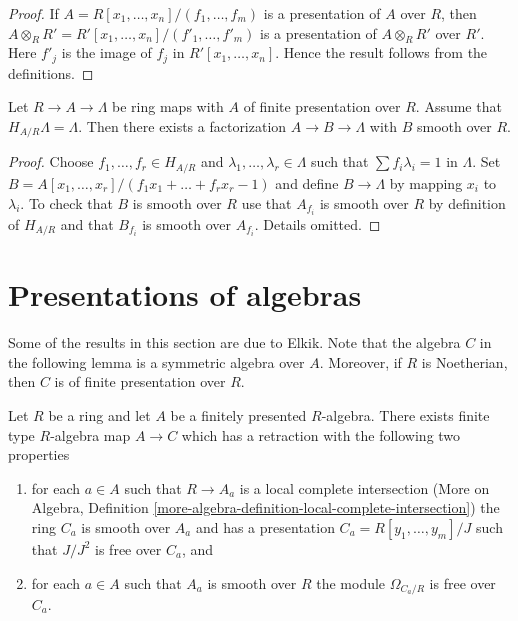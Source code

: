 \begin{proof}
If $A = R[x_1, \ldots, x_n]/(f_1, \ldots, f_m)$ is a presentation
of $A$ over $R$, then
$A \otimes_R R' = R'[x_1, \ldots, x_n]/(f'_1, \ldots, f'_m)$
is a presentation of $A \otimes_R R'$ over $R'$. Here $f'_j$ is
the image of $f_j$ in $R'[x_1, \ldots, x_n]$.
Hence the result follows from the definitions.
\end{proof}

\begin{lemma}
\label{lemma-final-solve}
Let $R \to A \to \Lambda$ be ring maps with $A$ of finite presentation
over $R$. Assume that $H_{A/R} \Lambda = \Lambda$. Then there exists
a factorization $A \to B \to \Lambda$ with $B$ smooth over $R$.
\end{lemma}

\begin{proof}
Choose $f_1, \ldots, f_r \in H_{A/R}$ and
$\lambda_1, \ldots, \lambda_r \in \Lambda$ such that
$\sum f_i\lambda_i = 1$ in $\Lambda$. Set
$B = A[x_1, \ldots, x_r]/(f_1x_1 + \ldots + f_rx_r - 1)$
and define $B \to \Lambda$ by mapping $x_i$ to $\lambda_i$.
To check that $B$ is smooth over $R$ use that $A_{f_i}$ is smooth
over $R$ by definition of $H_{A/R}$ and that $B_{f_i}$ is smooth
over $A_{f_i}$. Details omitted.
\end{proof}





\section{Presentations of algebras}
\label{section-presentations}

\noindent
Some of the results in this section are due to Elkik. Note that the algebra
$C$ in the following lemma is a symmetric algebra over $A$. Moreover, if
$R$ is Noetherian, then $C$ is of finite presentation over $R$.

\begin{lemma}
\label{lemma-improve-presentation}
Let $R$ be a ring and let $A$ be a finitely presented $R$-algebra.
There exists finite type $R$-algebra map $A \to C$ which has a
retraction with the following two properties
\begin{enumerate}
\item for each $a \in A$ such that $R \to A_a$ is a local complete
intersection (More on Algebra, Definition
\ref{more-algebra-definition-local-complete-intersection})
the ring $C_a$ is smooth over $A_a$ and has a presentation
$C_a = R[y_1, \ldots, y_m]/J$ such that $J/J^2$ is free over $C_a$, and
\item for each $a \in A$ such that $A_a$ is smooth over $R$ the
module $\Omega_{C_a/R}$ is free over $C_a$.
\end{enumerate}
\end{lemma}

